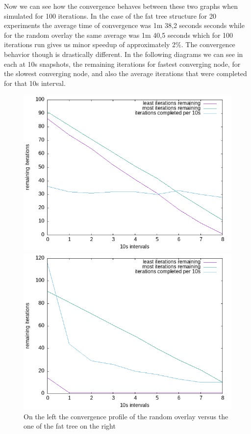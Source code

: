 \documentclass[12pt,notitlepage]{article}
\begin{document}
Now we can see how the convergence behaves between these two graphs when simulated for 100 iterations. In the case of the fat tree structure for 20 experiments
the average time of convergence was 1m 38,2 seconds seconds while  for the random overlay the same average was 1m 40,5 seconds which for 100 iterations run
gives us minor speedup of approximately 2\%. The convergence behavior though is drastically different. In the following diagrams we can see in each
at 10s snapshots, the remaining iterations for fastest converging node, for the slowest converging node, and also the average iterations that were completed for that 10s interval.
\begin{figure}
\centering
\begin{minipage}{.5\linewidth}
\centering
\includegraphics[scale=0.4]{img/random-1m40.png}
\end{minipage}%
\begin{minipage}{.5\linewidth}
\centering
\includegraphics[scale=0.4]{img/fat-1m38.png}
\end{minipage}
\caption{On the left the convergence profile of the random overlay versus the one of the fat tree on the right}
\end{figure}
\end{document}
